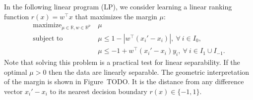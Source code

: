 \documentclass{article}
\newcommand{\RR}{\mathbb R}
\DeclareMathOperator*{\maximize}{maximize}
\begin{document}
In the following linear program (LP), we consider learning a linear
ranking function $r(x)=w^\intercal x$ that maximizes the margin $\mu$:
\begin{equation}
  \label{eq:max-margin-lp}
  \begin{aligned}
    \maximize_{\mu\in\RR, w\in\RR^p}\ & \mu \\
    \text{subject to}\ & \mu \leq 1-|w^\intercal (x_i' - x_i)|,\
    \forall\  i\in I_0,\\
    &\mu \leq -1 +  w^\intercal(x_i'-x_i)y_i,\ \forall\ i\in I_1\cup I_{-1}.
  \end{aligned}
\end{equation}
Note that solving this problem is a practical test for linear
separability. If the optimal $\mu>0$ then the data are linearly
separable. The geometric interpretation of the margin is shown in
Figure~TODO. It is the distance from any difference vector $x_i'-x_i$
to its nearest decision boundary $r(x)\in\{-1,1\}$.
\end{document}
